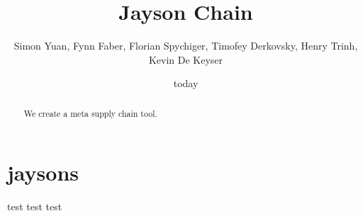 \documentclass[a4paper,twoside,twocolumn]{article} %
\title{Jayson Chain}
\author{Simon Yuan, Fynn Faber, Florian Spychiger, Timofey Derkovsky, Henry Trinh, Kevin De Keyser}
\begin{document}
\maketitle
\date{today}
\begin{abstract}
	We create a meta supply chain tool.
\end{abstract}


\section{jaysons}
test
test
test
\end{document}
